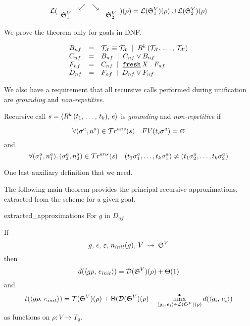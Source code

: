 \[ \mathcal{L}(\begin{array}{cccc} & \swarrow & \searrow \\ \mathfrak{S}_1^{V} & & & \mathfrak{S}_2^{V} \end{array})(\rho) =
      \mathcal{L}(\mathfrak{S}_1^{V})(\rho) \cup \mathcal{L}(\mathfrak{S}_2^{V})(\rho) \]

We prove the theorem only for goals in DNF.

\[
\begin{array}{lcl}
B_{nf} & = &  \mathcal{T}_\mathcal{X} \equiv \mathcal{T}_\mathcal{X} \; \mid \;
                     R^k\,(\mathcal{T}_\mathcal{X}, \, \dots, \, \mathcal{T}_\mathcal{X}) \\
C_{nf} & = & B_{nf} \; \mid \; C_{nf} \lor B_{nf} \\
F_{nf} & = & C_{nf} \; \mid \; \texttt{\underline {fresh}} \, X\;.\; F_{nf} \\
D_{nf} & = & F_{nf} \; \mid \; D_{nf} \lor F_{nf}
\end{array}
\]

We also have a requirement that all recursive calls performed during unification are \emph{grounding} and \emph{non-repetitive}.

\begin{definition}
Recursive call $s = \langle R^k\,(t_1, \, \dots, \, t_k) ,\, e \rangle$ is \emph{grounding} and \emph{non-repetitive} if 

\[ \forall (\sigma^{a}, n^{a}) \in \mathcal{T}r^{ans}(s) \quad FV(t_i \sigma^{a}) = \varnothing \]
and
\[ \forall (\sigma_1^{a}, n_1^{a}), (\sigma_2^{a}, n_2^{a}) \in \mathcal{T}r^{ans}(s) \quad (t_1 \sigma_1^{a}, \dots, t_k \sigma_1^{a}) \ne (t_1 \sigma_2^{a}, \dots, t_k \sigma_2^{a}) \]
\end{definition}

One last auxiliary definition that we need.

The following main theorem provides the principal recursive approximations, extracted from the scheme for a given goal.
 
\begin{reptheorem}{extracted_approximations}
For $g$ in $D_{nf}$ 

If \[  g, \, \epsilon, \, \varepsilon, \, n_{init}(g), \, V \; \rightsquigarrow \; \mathfrak{S}^{V}  \]
  then \[ d(\langle g\rho ,\, e_{init} \rangle) = \mathcal{D}(\mathfrak{S}^{V})(\rho) + \Theta(1) \]
  and
  \[ t(\langle g\rho ,\, e_{init} \rangle) = \mathcal{T}(\mathfrak{S}^{V})(\rho) + \Theta(\mathcal{D}(\mathfrak{S}^{V})(\rho)
  - \max^{\bullet}\limits_{\langle g_i ,\, e_i \rangle \in \mathcal{L}(\mathfrak{S}^{V})(\rho)} d(\langle g_i ,\, e_i \rangle) \]
  as functions on $\rho \colon V \to T_{\emptyset}$.
\end{reptheorem}

